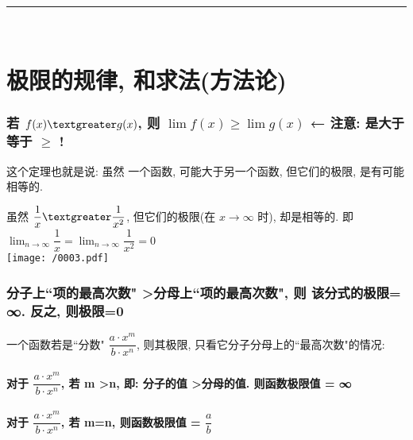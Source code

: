 \documentclass[UTF8]{ctexart}
\begin{document}
~\\
\hrule
~\\


\part{极限的规律, 和求法(方法论)}




\section{若 $ f(x) \textgreater g(x) $, 则 $ \lim f(x) \geq \lim g(x)$  ← 注意: 是大于等于 $\geq$ !}

这个定理也就是说: 虽然 一个函数, 可能大于另一个函数, 但它们的极限, 是有可能相等的. \\

\begin{tcolorbox}[title = {例},boxrule={0.1em},colframe={black!10}, colback={black!3},colbacktitle={black!10},coltitle={black}]
	虽然 $ \dfrac{1} {x} \textgreater \dfrac{1} {x^2}$, 但它们的极限(在 $x \to \infty$ 时), 却是相等的.  即 $ \lim_{n\rightarrow \infty}\dfrac{1}{x}=\lim_{n\rightarrow \infty}\dfrac{1}{x^2}=0
	$ 
	\\
	
	\texttt{[image: /0003.pdf]}
\end{tcolorbox}




\section{分子上``项的最高次数" \textgreater 分母上``项的最高次数", 则 该分式的极限= ∞. 反之, 则极限=0}

一个函数若是``分数" $ \dfrac{a \cdot x^m}{b \cdot x^n} $, 则其极限, 只看它分子分母上的``最高次数"的情况:






\subsection{对于 $ \dfrac{a \cdot x^m}{b \cdot x^n} $, 若 m \textgreater n, 即: 分子的值 \textgreater 分母的值. 则函数极限值 = ∞}






\subsection{对于 $ \dfrac{a \cdot x^m}{b \cdot x^n} $, 若 m=n, 则函数极限值 = $ \dfrac{a} {b}$}
\end{document}
